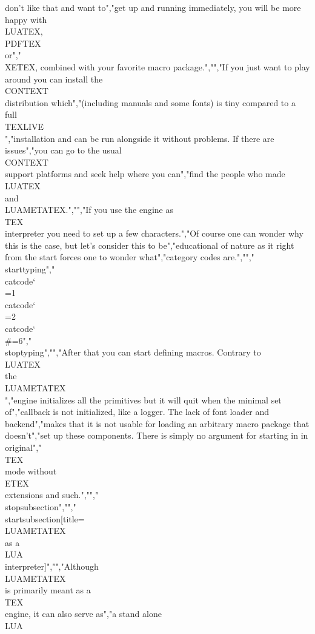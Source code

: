 don't like that and want to","get up and running immediately, you will be more happy with \\LUATEX, \\PDFTEX\\ or","\\XETEX, combined with your favorite macro package.","","If you just want to play around you can install the \\CONTEXT\\ distribution which","(including manuals and some fonts) is tiny compared to a full \\TEXLIVE\\","installation and can be run alongside it without problems. If there are issues","you can go to the usual \\CONTEXT\\ support platforms and seek help where you can","find the people who made \\LUATEX\\ and \\LUAMETATEX.","","If you use the engine as \\TEX\\ interpreter you need to set up a few characters.","Of course one can wonder why this is the case, but let's consider this to be","educational of nature as it right from the start forces one to wonder what","category codes are.","","\\starttyping","\\catcode`\\{=1 \\catcode`\\}=2 \\catcode`\\#=6","\\stoptyping","","After that you can start defining macros. Contrary to \\LUATEX\\ the \\LUAMETATEX\\","engine initializes all the primitives but it will quit when the minimal set of","callback is not initialized, like a logger. The lack of font loader and backend","makes that it is not usable for loading an arbitrary macro package that doesn't","set up these components. There is simply no argument for starting in in original","\\TEX\\ mode without \\ETEX\\ extensions and such.","","\\stopsubsection","","\\startsubsection[title={\\LUAMETATEX\\ as a \\LUA\\ interpreter}]","","Although \\LUAMETATEX\\ is primarily meant as a \\TEX\\ engine, it can also serve as","a stand alone \\LUA\\ 